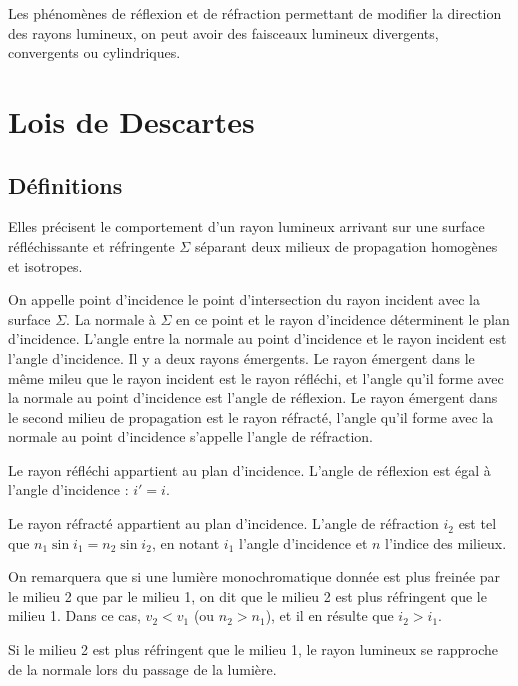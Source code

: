 Les phénomènes de réflexion et de réfraction permettant de modifier la direction des rayons lumineux, on peut avoir des faisceaux lumineux divergents, convergents ou cylindriques.

\section{Lois de Descartes}
\label{chap6-sec:LoisdeSnellDescartes}

\subsection{Définitions}
\label{chap6-subsec:définitions}

Elles précisent le comportement d'un rayon lumineux arrivant sur une surface réfléchissante et réfringente $\Sigma$ séparant deux milieux de propagation homogènes et isotropes.

On appelle point d'incidence le point d'intersection du rayon incident avec la surface $\Sigma$. La normale à $\Sigma$ en ce point et le rayon d'incidence déterminent le plan d'incidence. L'angle entre la normale au point d'incidence et le rayon incident est l'angle d'incidence. Il y a deux rayons émergents. Le rayon émergent dans le même mileu que le rayon incident est le rayon réfléchi, et l'angle qu'il forme avec la normale au point d'incidence est l'angle de réflexion. Le rayon émergent dans le second milieu de propagation est le rayon réfracté, l'angle qu'il forme avec la normale au point d'incidence s'appelle l'angle de réfraction.

\begin{theo}
  Le rayon réfléchi appartient au plan d'incidence. L'angle de réflexion est égal à l'angle d'incidence : $i'=i$.
\end{theo}
\begin{theo}
  Le rayon réfracté appartient au plan d'incidence. L'angle de réfraction $i_2$ est tel que $n_1 \sin i_1 = n_2 \sin i_2$, en notant $i_1$ l'angle d'incidence et $n$ l'indice des milieux.
\end{theo}

On remarquera que si une lumière monochromatique donnée est plus freinée par le milieu 2 que par le milieu 1, on dit que le milieu 2 est plus réfringent que le milieu 1. Dans ce cas, $v_2 < v_1$ (ou $n_2 > n_1$), et il en résulte que $i_2 > i_1$.

Si le milieu 2 est plus réfringent que le milieu 1, le rayon lumineux se rapproche de la normale lors du passage de la lumière.

